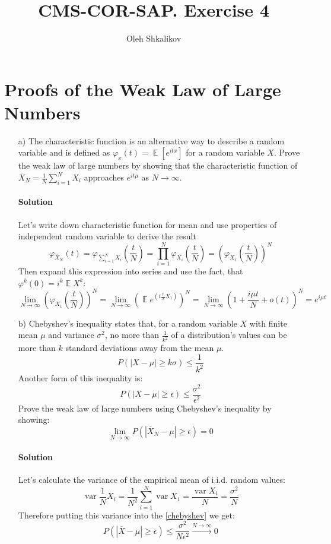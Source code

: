 \documentclass[a4paper, 12pt]{article}
\title{CMS-COR-SAP. Exercise 4}
\author{Oleh Shkalikov}
\DeclareMathOperator{\E}{\mathbb{E}}
\DeclareMathOperator{\var}{var}
\newcommand{\rbra}[1]{\left( #1 \right)}
\newcommand{\sol}{
    \paragraph{Solution}
}
\begin{document}
\maketitle

\section{Proofs of the Weak Law of Large Numbers}
\begin{enumerate}
    \item[a)] The characteristic function is an alternative way to describe a random variable and
        is defined as $\varphi_x(t) = \E[e^{itx}]$ for a random variable $X$.
        Prove the weak law of large numbers by showing that the characteristic
        function of $\overline{X}_N = \frac{1}{N} \sum\limits_{i=1}^{N} X_i $ approaches
        $e^{it\mu}$ as $N \to \infty$.

        \sol Let's write down characteristic function for mean and
        use properties of independent random variable to derive the result
        \[
            \varphi_{\overline{X}_N}(t) =
            \varphi_{\sum\limits_{i=1}^N X_i} \rbra{\frac{t}{N}} =
            \prod\limits_{i=1}^{N} \varphi_{X_i} \rbra{\frac{t}{N}} =
            \rbra{\varphi_{X_1} \rbra{\frac{t}{N}}}^N
        \]
        Then expand this expression into series and use the fact, that
        $\varphi^{k}(0) = i^k \E X^k$:
        \[
            \lim\limits_{N \to \infty} \rbra{\varphi_{X_1} \rbra{\frac{t}{N}}}^N =
            \lim\limits_{N \to \infty} \rbra{\E e^{\rbra{i \frac{t}{N} X_1}}}^N =
            \lim\limits_{N \to \infty} \rbra{1 + \frac{i \mu t}{N} + o(t)}^N =
            e^{i \mu t}
        \]

    \item[b)] Chebyshev’s inequality states that, for a random variable $X$ with finite mean $\mu$ and
        variance $\sigma^2$, no more than $\frac{1}{k^2}$ of a distribution’s values can be
        more than $k$ standard deviations away from the mean $\mu$.
        \[
            P(|X - \mu| \geq k \sigma) \leq \frac{1}{k^2}
        \]
        Another form of this inequality is:
        \begin{equation} \label{chebyshev}
            P(|X - \mu| \geq \epsilon) \leq \frac{\sigma^2}{\epsilon^2}
        \end{equation}
        Prove the weak law of large numbers using Chebyshev’s inequality by showing:
        \[
            \lim\limits_{N \to \infty} P (|\overline{X}_N - \mu| \geq \epsilon) = 0
        \]

        \sol Let's calculate the variance of the empirical mean of i.i.d. random values:
        \[
            \var\frac{1}{N} X_i =
            \frac{1}{N^2} \sum\limits_{i=1}^{N} \var X_1 =
            \frac{\var X_i}{N} = \frac{\sigma^2}{N}
        \]
        Therefore putting this variance into the \eqref{chebyshev} we get:
        \[
            P(|\overline{X} - \mu| \geq \epsilon) \leq \frac{\sigma^2}{N \epsilon^2} \stackrel{N \to \infty}{\to} 0
        \]
\end{enumerate}
\end{document}
